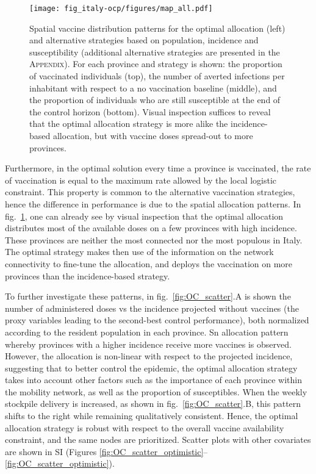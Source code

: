 \begin{figure}[!ht]
    \centering
    \texttt{[image: fig\_italy-ocp/figures/map\_all.pdf]}
    \caption[Spatial vaccine distribution patterns]{Spatial vaccine distribution patterns for the optimal allocation (left) and alternative strategies based on population, incidence and susceptibility (additional alternative strategies are presented in the \textsc{Appendix}). For each province and strategy is shown: the proportion of vaccinated individuals (top), the number of averted infections per inhabitant with respect to a no vaccination baseline (middle), and the proportion of individuals who are still susceptible at the end of the control horizon (bottom). Visual inspection suffices to reveal that the optimal allocation strategy is more alike the incidence-based allocation, but with vaccine doses spread-out to more provinces.}
    \label{fig:OC_multimap}
\end{figure}

Furthermore, in the optimal solution every time a province is vaccinated, the rate of vaccination is equal to the maximum rate allowed by the local logistic constraint. This property is common to the alternative vaccination strategies, hence the difference in performance is due to the spatial allocation patterns.%
In fig.~\ref{fig:OC_multimap}, one can already see by visual inspection that the optimal allocation distributes most of the available doses on a few provinces with high incidence. These provinces are neither the most connected nor the most populous in Italy. The optimal strategy makes then use of the information on the network connectivity to fine-tune the allocation, and deploys the vaccination on more provinces than the incidence-based strategy. %

To further investigate these patterns, in fig.~\ref{fig:OC_scatter}.A is shown the number of administered doses vs the incidence projected without vaccines (the proxy variables leading to the second-best control performance), both normalized according to the resident population in each province. Sn allocation pattern whereby provinces with a higher incidence receive more vaccines is observed. However, the allocation is non-linear with respect to the projected incidence, suggesting that to better control the epidemic, the optimal allocation strategy takes into account other factors such as the importance of each province within the mobility network, as well as the proportion of susceptibles. When the weekly stockpile delivery is increased, as shown in fig.~\ref{fig:OC_scatter}.B, this pattern shifts to the right while remaining qualitatively consistent. Hence, the optimal allocation strategy is robust with respect to the overall vaccine availability constraint, and the same nodes are prioritized. Scatter plots with other covariates are shown in SI (Figures \ref{fig:OC_scatter_optimistic}--\ref{fig:OC_scatter_optimistic}). 


